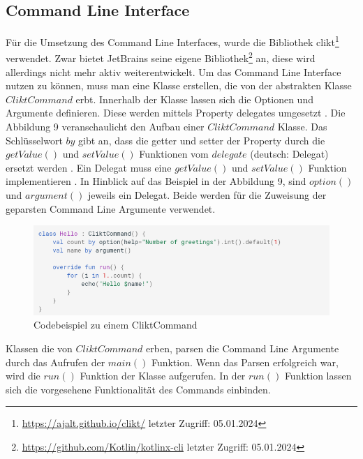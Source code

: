 \documentclass{article}
\begin{document}
\subsection{Command Line Interface}
Für die Umsetzung des Command Line Interfaces, wurde die Bibliothek clikt\footnote{\url{https://ajalt.github.io/clikt/} letzter Zugriff: 05.01.2024} verwendet. Zwar bietet JetBrains seine eigene Bibliothek\footnote{\url{https://github.com/Kotlin/kotlinx-cli} letzter Zugriff: 05.01.2024} an, diese wird allerdings nicht mehr aktiv weiterentwickelt. Um das Command Line Interface nutzen zu können, muss man eine Klasse erstellen, die von der abstrakten Klasse $CliktCommand$ erbt. Innerhalb der Klasse lassen sich die Optionen und Argumente definieren. Diese werden mittels Property delegates umgesetzt \cite{clikt}. Die Abbildung 9 veranschaulicht den Aufbau einer $CliktCommand$ Klasse. Das Schlüsselwort $by$ gibt an, dass die getter und setter der Property durch die $getValue()$ und $setValue()$ Funktionen vom $delegate$ (deutsch: Delegat) ersetzt werden \cite{KotlinLangDocDelegatedProperties}. Ein Delegat muss eine $getValue()$ und $setValue()$ Funktion implementieren \cite{KotlinLangDocDelegatedProperties}.
\newline In Hinblick auf das Beispiel in der Abbildung 9, sind $option()$ und $argument()$ jeweils ein Delegat. Beide werden für die Zuweisung der geparsten Command Line Argumente verwendet.
\begin{figure}[!htb]
    \centering
    \includegraphics[width=\linewidth]{img/CliktCommand.png}
    \caption{Codebeispiel zu einem CliktCommand\footnotemark}
\end{figure}
Klassen die von $CliktCommand$ erben, parsen die Command Line Argumente durch das Aufrufen der $main()$ Funktion. Wenn das Parsen erfolgreich war, wird die $run()$ Funktion der Klasse aufgerufen. In der $run()$ Funktion lassen sich die vorgesehene Funktionalität des Commands einbinden.
\end{document}
